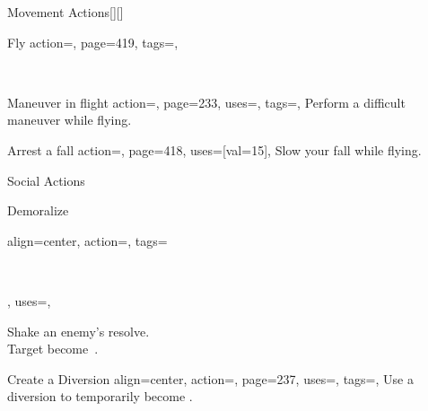 \begin{PageBackLandscape}
\begin{TablesHalf}{\backTableHeight}
\begin{Table}{Movement Actions}[][]
\begin{entry}{Fly}{%
                action=,
                page=419,
                tags=\Move,
            }
                \parbox{0.5\linewidth}{\raggedleft
                \\
                }%
            \end{entry}
            \begin{entry}{Maneuver in flight}{%
                action=,
                page=233,
                uses={\Acrobatics[tags={T}]},
                tags=\Move,
            }
                Perform a difficult maneuver while flying.\hfill {}\quad
            \end{entry}
            \begin{entry}{Arrest a fall}{%
                action=,
                page=418,
                uses={[val=15]},
            }
                Slow your fall while flying.
            \end{entry}
        \end{Table}
        \TableSpace
        \begin{Table}{Social Actions}
            \begin{entry}{Demoralize}{%
                align=center,
                action=,
                tags=\parbox{0.52\linewidth}{\raggedleft{}\,\Concentrate\\\Mental\Emotion\Fear},
                uses=\InitimidationWill,
            }
                Shake an enemy's resolve. \Auditory \ \hfill
                \\
                Target become \Frightened\,.\hfill
            \end{entry}
            \begin{entry}{Create a Diversion}{%
                align=center,
                action=,
                page=237,
                uses=\DeceptionPerception,
                tags=\Mental,
            }
                Use a diversion to temporarily become \Hidden.\hfill
                \\

\end{entry}
\end{Table}
\end{TablesHalf}
\end{PageBackLandscape}
